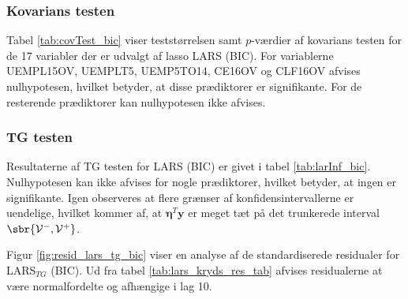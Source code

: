 \subsubsection{Kovarians testen}
Tabel \ref{tab:covTest_bic} viser teststørrelsen samt $p$-værdier af kovarians testen for de 17 variabler der er udvalgt af lasso LARS (BIC). 
For variablerne  \textcolor{blue3}{UEMPL15OV}, \textcolor{blue3}{UEMPLT5}, \textcolor{blue3}{UEMP5TO14}, \textcolor{blue3}{CE16OV} og \textcolor{blue3}{CLF16OV} afvises nulhypotesen, hvilket betyder, at disse prædiktorer er signifikante. 
For de resterende prædiktorer kan nulhypotesen ikke afvises. 
\newpage


\subsubsection{TG testen}
Resultaterne af TG testen for LARS (BIC) er givet i tabel \ref{tab:larInf_bic}.
Nulhypotesen kan ikke afvises for nogle prædiktorer, hvilket betyder, at ingen er signifikante.
Igen observeres at flere grænser af konfidensintervallerne er uendelige, hvilket kommer af, at $\boldsymbol{\eta}^T \textbf{y}$ er meget tæt på det trunkerede interval \(\sbr{\mathcal{V}^-, \mathcal{V}^+}\).



Figur \ref{fig:resid_lars_tg_bic} viser en analyse af de standardiserede residualer for LARS$_{TG}$ (BIC). 
Ud fra tabel \ref{tab:lars_kryds_res_tab} afvises residualerne at være normalfordelte og afhængige i lag 10.






